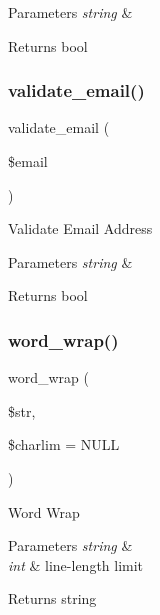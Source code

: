 \begin{DoxyParams}{Parameters}
{\em string} & \\
\hline
\end{DoxyParams}
\begin{DoxyReturn}{Returns}
bool 
\end{DoxyReturn}
\mbox{\label{class_c_i___email_a1907f0dba44e2968b8260dbc5770550f}} 
\subsubsection{\texorpdfstring{validate\+\_\+email()}{validate\_email()}}
{\footnotesize\ttfamily validate\+\_\+email (\begin{DoxyParamCaption}\item[{}]{\$email }\end{DoxyParamCaption})}

Validate Email Address


\begin{DoxyParams}{Parameters}
{\em string} & \\
\hline
\end{DoxyParams}
\begin{DoxyReturn}{Returns}
bool 
\end{DoxyReturn}
\mbox{\label{class_c_i___email_aa3a2a5440115b320a0c2fcea542e546a}} 
\subsubsection{\texorpdfstring{word\+\_\+wrap()}{word\_wrap()}}
{\footnotesize\ttfamily word\+\_\+wrap (\begin{DoxyParamCaption}\item[{}]{\$str,  }\item[{}]{\$charlim = {\ttfamily NULL} }\end{DoxyParamCaption})}

Word Wrap


\begin{DoxyParams}{Parameters}
{\em string} & \\
\hline
{\em int} & line-\/length limit \\
\hline
\end{DoxyParams}
\begin{DoxyReturn}{Returns}
string 
\end{DoxyReturn}


